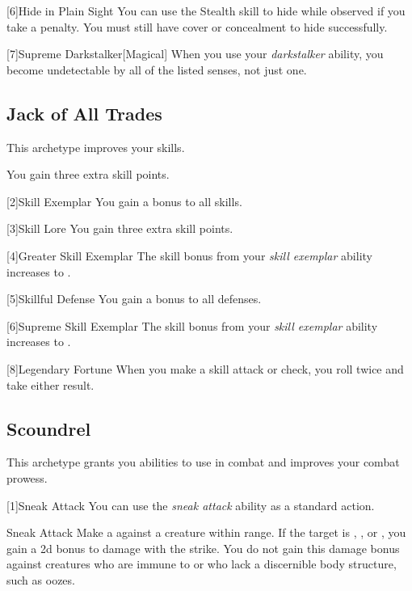         [6]{Hide in Plain Sight} You can use the Stealth skill to hide while observed if you take a  penalty.
        You must still have cover or concealment to hide successfully.

        [7]{Supreme Darkstalker}[Magical] When you use your \textit{darkstalker} ability, you become undetectable by all of the listed senses, not just one.

    \subsection{Jack of All Trades}
        This archetype improves your skills.

         You gain three extra skill points.

        [2]{Skill Exemplar} You gain a  bonus to all skills.

        [3]{Skill Lore} You gain three extra skill points.

        [4]{Greater Skill Exemplar} The skill bonus from your \textit{skill exemplar} ability increases to .

        [5]{Skillful Defense} You gain a  bonus to all defenses.

        [6]{Supreme Skill Exemplar} The skill bonus from your \textit{skill exemplar} ability increases to .

        [8]{Legendary Fortune} When you make a skill attack or check, you roll twice and take either result.

    \subsection{Scoundrel}
        This archetype grants you abilities to use in combat and improves your combat prowess.

        [1]{Sneak Attack} You can use the \textit{sneak attack} ability as a standard action.
        \begin{freeability}{Sneak Attack}
            Make a  against a creature within \rngclose range.
            If the target is \unaware, , or , you gain a \plus2d bonus to damage with the strike.
            You do not gain this damage bonus against creatures who are immune to  or who lack a discernible body structure, such as oozes.
        \end{freeability}

